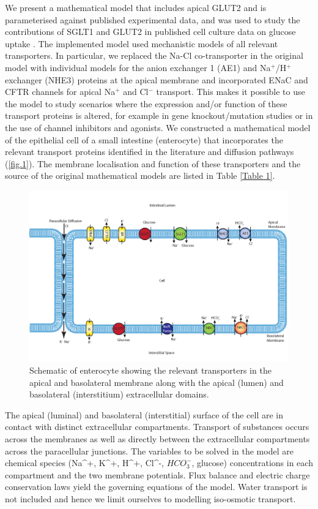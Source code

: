 \documentclass[fleqn,10pt]{physiome}
\begin{document}
We present a mathematical model that includes apical GLUT2 and is parameterised against published experimental data, and was used to study the contributions of SGLT1 and GLUT2 in published cell culture data on glucose uptake \citep{zheng2012mechanisms}. The implemented model used mechanistic models of all relevant transporters. In particular, we replaced the Na-Cl co-transporter in the original model with individual models for the anion
exchanger 1 (AE1) and Na$^+$/H$^+$ exchanger (NHE3) proteins at the apical
membrane and incorporated ENaC and CFTR channels for apical Na$^+$ and Cl$^-$ transport.
This makes it possible to use the model to study scenarios where the
expression and/or function of these transport proteins is altered, for example
in gene knockout/mutation studies or in the use of channel inhibitors and agonists. We constructed a mathematical model of the epithelial cell of a small intestine (enterocyte) that incorporates the relevant transport proteins identified in the
literature \citep{barrett2015electrolyte} and diffusion pathways (\autoref{fig.1}). The
membrane localisation and function of these transporters and the source of the
original mathematical models are listed in Table \ref{Table 1}.\newline

\begin{figure}[H]
\centering
\includegraphics[width=0.85\linewidth]{fig01.jpg}
\caption{Schematic of enterocyte showing the relevant
transporters in the apical and basolateral membrane along with
the apical (lumen) and basolateral (interstitium) extracellular
domains.}
\label{fig.1}
\end{figure}\newline


The apical (luminal) and
basolateral (interstitial) surface of the cell are in contact with distinct extracellular
compartments. Transport of substances occurs across the membranes as
well as directly between the extracellular compartments across the paracellular
junctions. The variables to be solved in the model are chemical species ({Na^+},
{K^+}, {H^+}, {Cl^-}, ${HCO_3^-}$, glucose) concentrations in each compartment and the
two membrane potentials. Flux balance and electric charge conservation laws
yield the governing equations of the model. Water transport is not included and
hence we limit ourselves to modelling iso-osmotic transport.\newline
\end{document}
